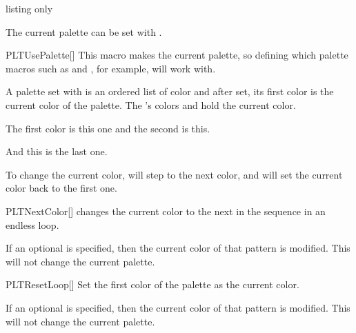 \documentclass[a4paper, 11pt]{article}
\begin{document}
\begin{tcblisting}{listing only}
\end{tcblisting}

The current palette can be set with .

\begin{macro}{PLTUsePalette}[]
    This macro makes  the current palette, so defining which palette macros such as  and , for example, will work with.
\end{macro}

A palette set with  is an ordered list of color and after set, its first color is the current color of the palette. The 's colors  and  hold the current color.

\begin{tcblisting}{}

    The first color is \colorbox{PLTBGColor}{\textcolor{PLTFGColor}{this one}} and the second is \PLTNextColor\colorbox{PLTBGColor}{\textcolor{PLTFGColor}{this}}.

    \PLTNextColor
    And \colorbox{PLTBGColor}{\textcolor{PLTFGColor}{this}} is the last one.
\end{tcblisting}


To change the current color,  will step to the next color, and  will set the current color back to the first one.

\begin{macro}{PLTNextColor}[]
     changes the current color to the next in the sequence in an endless loop.

    If an optional  is specified, then the current color of that pattern is modified. This will not change the current palette.
\end{macro}

\begin{macro}{PLTResetLoop}[]
    Set the first color of the palette as the current color.

    If an optional  is specified, then the current color of that pattern is modified. This will not change the current palette.
\end{macro}
\end{document}
